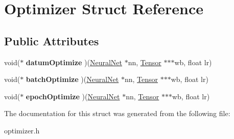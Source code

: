 \hypertarget{structOptimizer}{}\section{Optimizer Struct Reference}
\label{structOptimizer}
\subsection*{Public Attributes}
\begin{DoxyCompactItemize}
\item 
void($\ast$ {\bfseries datum\+Optimize} )(\hyperlink{structNeuralNet}{Neural\+Net} $\ast$nn, \hyperlink{structTensor}{Tensor} $\ast$$\ast$$\ast$wb, float lr)\hypertarget{structOptimizer_aeb9a5f30b22d2e2fe2f14a0cc19dc681}{}\label{structOptimizer_aeb9a5f30b22d2e2fe2f14a0cc19dc681}

\item 
void($\ast$ {\bfseries batch\+Optimize} )(\hyperlink{structNeuralNet}{Neural\+Net} $\ast$nn, \hyperlink{structTensor}{Tensor} $\ast$$\ast$$\ast$wb, float lr)\hypertarget{structOptimizer_a4ff251084245d6d923201ddd0058744a}{}\label{structOptimizer_a4ff251084245d6d923201ddd0058744a}

\item 
void($\ast$ {\bfseries epoch\+Optimize} )(\hyperlink{structNeuralNet}{Neural\+Net} $\ast$nn, \hyperlink{structTensor}{Tensor} $\ast$$\ast$$\ast$wb, float lr)\hypertarget{structOptimizer_a53664290cfd68873dc85db8ec967c457}{}\label{structOptimizer_a53664290cfd68873dc85db8ec967c457}

\end{DoxyCompactItemize}


The documentation for this struct was generated from the following file\+:\begin{DoxyCompactItemize}
\item 
optimizer.\+h\end{DoxyCompactItemize}
